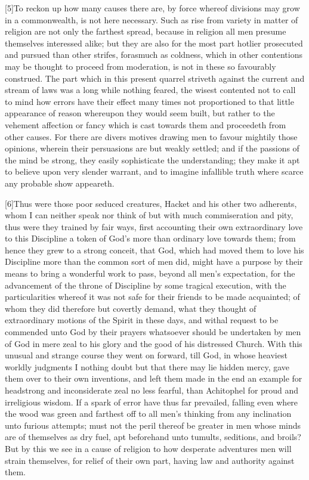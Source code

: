 [5]To reckon up how many causes there are, by force whereof divisions may grow in a commonwealth, is not here necessary. Such as rise from variety in matter of religion are not only the farthest spread, because in religion all men presume themselves interessed alike; but they are also for the most part hotlier prosecuted and pursued than other strifes, forasmuch as coldness, which in other contentions may be thought to proceed from moderation, is not in these so favourably construed. The part which in this present quarrel striveth against the current and stream of laws was a long while nothing feared, the wisest contented not to call to mind how errors have their effect many times not proportioned to that little appearance of reason whereupon they would seem built, but rather to the vehement affection or fancy which is cast towards them and proceedeth from other causes. For there are divers motives drawing men to favour mightily those opinions, wherein their persuasions are but weakly settled; and if the passions of the mind be strong, they easily sophisticate the understanding; they make it apt to believe upon very slender warrant, and to imagine infallible truth where scarce any probable show appeareth.

[6]Thus were those poor seduced creatures, Hacket and his other two adherents, whom I can neither speak nor think of but with much commiseration and pity, thus were they trained by fair ways, first accounting their own extraordinary love to this Discipline a token of God’s more than ordinary love towards them; from hence they grew to a strong conceit, that God, which had moved them to love his Discipline more than the common sort of men did, might have a purpose by their means to bring a wonderful work to pass, beyond all men’s expectation, for the advancement of the throne of Discipline by some tragical execution, with the particularities whereof it was not safe for their friends to be made acquainted; of whom they did therefore but covertly demand, what they thought of extraordinary motions of the Spirit in these days, and withal request to be commended unto God by their prayers whatsoever should be undertaken by men of God in mere zeal to his glory and the good of his distressed Church. With this unusual and strange course they went on forward, till God, in whose heaviest worldly judgments I nothing doubt but that there may lie hidden mercy, gave them over to their own inventions, and left them made in the end an example for headstrong and inconsiderate zeal no less fearful, than Achitophel for proud and irreligious wisdom. If a spark of error have thus far prevailed, falling even where the wood was green and farthest off to all men’s thinking from any inclination unto furious attempts; must not the peril thereof be greater in men whose minds are of themselves as dry fuel, apt beforehand unto tumults, seditions, and broils? But by this we see in a cause of religion to how desperate adventures men will strain themselves, for relief of their own part, having law and authority against them.

